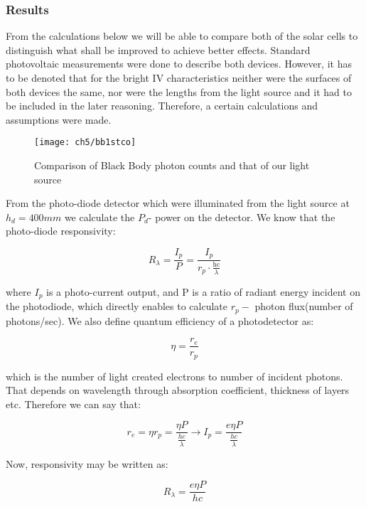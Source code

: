 \newpage
\subsubsection{Results}

From the calculations below we will be able to compare both of the solar cells to distinguish what shall be improved to achieve better effects. Standard photovoltaic measurements were done to describe both devices. However, it has to be denoted that for the bright IV characteristics neither were the surfaces of both devices the same, nor were the lengths from the light source and it had to be included in the later reasoning. Therefore, a certain calculations and assumptions were made.

\begin{figure}[H]
\center
\texttt{[image: ch5/bb1stco]}
\caption{Comparison of Black Body photon counts and that of our light source}
\end{figure}

From the photo-diode detector which were illuminated from the light source at \(h_{d} = 400mm\) we calculate the \(P_{d}\)- power on the detector. We know that the photo-diode responsivity:

\begin{equation}
R_{\lambda} = \frac{I_{p}}{P} = \frac{I_{p}}{r_{p} \cdot \frac{\text{hc}}{\lambda}}
\end{equation}

where \(I_{p}\) is a photo-current output, and P is a ratio of radiant
energy incident on the photodiode, which directly enables to calculate
\(r_{p} -\) photon flux(number of photons/sec). We also define quantum efficiency of a photodetector as:

\begin{equation}
\eta = \frac{r_{e}}{r_{p}}
\end{equation}

which is the number of light created electrons to number of incident photons. That depends on wavelength through absorption coefficient, thickness of layers etc. Therefore we can say that:

\begin{equation}
r_{e} = \eta r_{p} = \frac{\eta P}{\frac{hc}{\lambda}} \rightarrow I_{p} = \frac{e\eta P}{\frac{hc}{\lambda}}
\end{equation}


Now, responsivity may be written as:

\begin{equation}
R_{\lambda} = \frac{e\eta P}{hc}
\end{equation}


